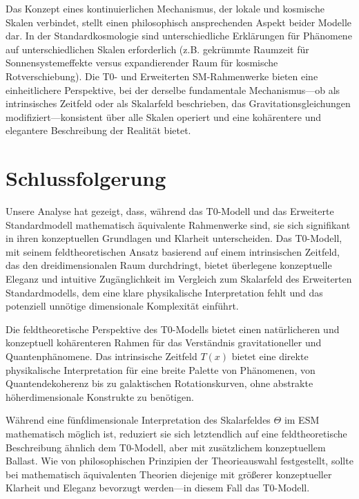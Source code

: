 \documentclass[12pt,a4paper]{article}
\newcommand{\Tfield}{T(x)}
\begin{document}
	Das Konzept eines kontinuierlichen Mechanismus, der lokale und kosmische Skalen verbindet, stellt einen philosophisch ansprechenden Aspekt beider Modelle dar. In der Standardkosmologie sind unterschiedliche Erklärungen für Phänomene auf unterschiedlichen Skalen erforderlich (z.B. gekrümmte Raumzeit für Sonnensystemeffekte versus expandierender Raum für kosmische Rotverschiebung). Die T0- und Erweiterten SM-Rahmenwerke bieten eine einheitlichere Perspektive, bei der derselbe fundamentale Mechanismus—ob als intrinsisches Zeitfeld oder als Skalarfeld beschrieben, das Gravitationsgleichungen modifiziert—konsistent über alle Skalen operiert und eine kohärentere und elegantere Beschreibung der Realität bietet.
	
	\section{Schlussfolgerung}
	\label{sec:conclusion}
	
	Unsere Analyse hat gezeigt, dass, während das T0-Modell und das Erweiterte Standardmodell mathematisch äquivalente Rahmenwerke sind, sie sich signifikant in ihren konzeptuellen Grundlagen und Klarheit unterscheiden. Das T0-Modell, mit seinem feldtheoretischen Ansatz basierend auf einem intrinsischen Zeitfeld, das den dreidimensionalen Raum durchdringt, bietet überlegene konzeptuelle Eleganz und intuitive Zugänglichkeit im Vergleich zum Skalarfeld des Erweiterten Standardmodells, dem eine klare physikalische Interpretation fehlt und das potenziell unnötige dimensionale Komplexität einführt.
	
	Die feldtheoretische Perspektive des T0-Modells bietet einen natürlicheren und konzeptuell kohärenteren Rahmen für das Verständnis gravitationeller und Quantenphänomene. Das intrinsische Zeitfeld \(\Tfield\) bietet eine direkte physikalische Interpretation für eine breite Palette von Phänomenen, von Quantendekoherenz bis zu galaktischen Rotationskurven, ohne abstrakte höherdimensionale Konstrukte zu benötigen.
	
	Während eine fünfdimensionale Interpretation des Skalarfeldes \(\Theta\) im ESM mathematisch möglich ist, reduziert sie sich letztendlich auf eine feldtheoretische Beschreibung ähnlich dem T0-Modell, aber mit zusätzlichem konzeptuellem Ballast. Wie von philosophischen Prinzipien der Theorieauswahl festgestellt, sollte bei mathematisch äquivalenten Theorien diejenige mit größerer konzeptueller Klarheit und Eleganz bevorzugt werden—in diesem Fall das T0-Modell.
	
\end{document}
